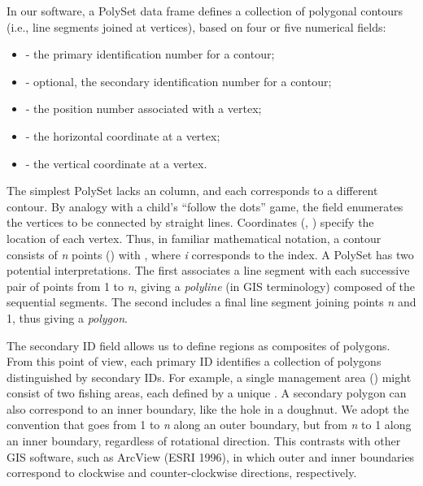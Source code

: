 \documentclass[letterpaper]{book}
\begin{document}
\begin{Details}\relax
In our software, a PolySet data frame defines a collection of polygonal
contours (i.e., line segments joined at vertices), based on four or five
numerical fields:
\begin{itemize}

\item {} - the primary identification number for a contour;
\item {} - optional, the secondary identification number for a
contour;
\item {} - the position number associated with a vertex;
\item {} - the horizontal coordinate at a vertex;
\item {} - the vertical coordinate at a vertex.

\end{itemize}

The simplest PolySet lacks an  column, and each 
corresponds to a different contour. By analogy with a child's
``follow the dots'' game, the  field enumerates the
vertices to be connected by straight lines. Coordinates (,
) specify the location of each vertex. Thus, in familiar
mathematical notation, a contour consists of \emph{n} points () with , where \emph{i} corresponds to the
 index. A PolySet has two potential interpretations. The first
associates a line segment with each successive pair of points from 1 to
\emph{n}, giving a \emph{polyline} (in GIS terminology) composed of the
sequential segments. The second includes a final line segment joining
points \emph{n} and 1, thus giving a \emph{polygon}.

The secondary ID field allows us to define regions as composites of
polygons. From this point of view, each primary ID identifies a
collection of polygons distinguished by secondary IDs. For example, a
single management area () might consist of two fishing areas,
each defined by a unique . A secondary polygon can also
correspond to an inner boundary, like the hole in a doughnut. We adopt
the convention that  goes from 1 to \emph{n} along an outer
boundary, but from \emph{n} to 1 along an inner boundary, regardless of
rotational direction. This contrasts with other GIS software, such as
ArcView (ESRI 1996), in which outer and inner boundaries correspond to
clockwise and counter-clockwise directions, respectively.


\end{Details}
\end{document}
